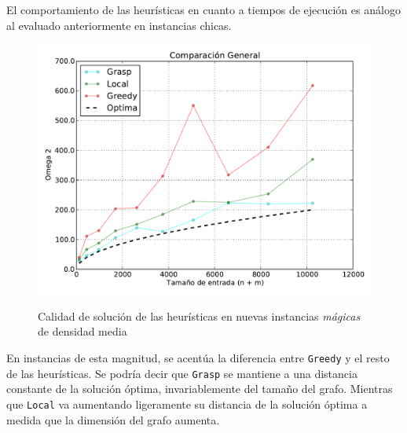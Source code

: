 El comportamiento de las heurísticas en cuanto a tiempos de ejecución es análogo al evaluado anteriormente en instancias chicas.

\begin{figure}[H]
\begin{center}
\includegraphics[angle=0, scale=.75]{imagenes/todas_calidad_2014-07-25_15-53-33.pdf}
\label{grafico local calidad}
\caption{Calidad de solución de las heurísticas en nuevas instancias \textit{mágicas} de densidad media}
\end{center}
\end{figure}

En instancias de esta magnitud, se acentúa la diferencia entre \texttt{Greedy} y el resto de las heurísticas. Se podría decir que \texttt{Grasp} se mantiene a una distancia constante de la solución óptima, invariablemente del tamaño del grafo. Mientras que \texttt{Local} va aumentando ligeramente su distancia de la solución óptima a medida que la dimensión del grafo aumenta.

